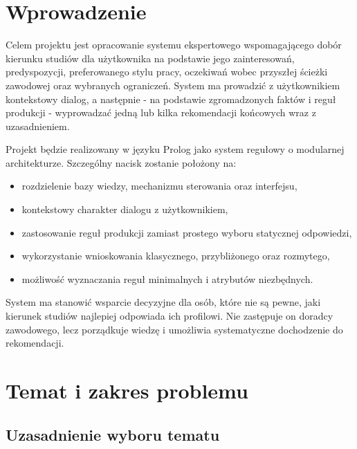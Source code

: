 \documentclass[12pt,a4paper,oneside]{article}
\begin{document}


\vspace{1em}

{
\setcounter{tocdepth}{1}
\setlength{\parskip}{0pt}
\tableofcontents
}
\newpage

\section{Wprowadzenie}

Celem projektu jest opracowanie systemu ekspertowego wspomagającego dobór kierunku studiów dla użytkownika na podstawie jego zainteresowań, predyspozycji, preferowanego stylu pracy, oczekiwań wobec przyszłej ścieżki zawodowej oraz wybranych ograniczeń. System ma prowadzić z użytkownikiem kontekstowy dialog, a następnie - na podstawie zgromadzonych faktów i reguł produkcji - wyprowadzać jedną lub kilka rekomendacji końcowych wraz z uzasadnieniem.

Projekt będzie realizowany w języku Prolog jako system regułowy o modularnej architekturze. Szczególny nacisk zostanie położony na:
\begin{itemize}[leftmargin=1.2cm]
    \item rozdzielenie bazy wiedzy, mechanizmu sterowania oraz interfejsu,
    \item kontekstowy charakter dialogu z użytkownikiem,
    \item zastosowanie reguł produkcji zamiast prostego wyboru statycznej odpowiedzi,
    \item wykorzystanie wnioskowania klasycznego, przybliżonego oraz rozmytego,
    \item możliwość wyznaczania reguł minimalnych i atrybutów niezbędnych.
\end{itemize}

System ma stanowić wsparcie decyzyjne dla osób, które nie są pewne, jaki kierunek studiów najlepiej odpowiada ich profilowi. Nie zastępuje on doradcy zawodowego, lecz porządkuje wiedzę i umożliwia systematyczne dochodzenie do rekomendacji.

\section{Temat i zakres problemu}

\subsection{Uzasadnienie wyboru tematu}
\end{document}
